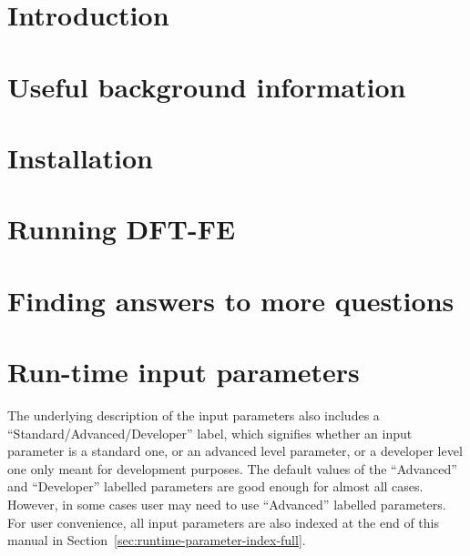 \documentclass{article}
\newcommand{\dftfe}{\textsc{DFT-FE}}
\begin{document}

\pagebreak

\tableofcontents

\pagebreak

\section{Introduction}
\label{sec:intro}


\section{Useful background information}
\label{sec:background}


\section{Installation}
\label{sec:installation}


\section{Running \dftfe}
\label{sec:run}


%

\section{Finding answers to more questions}
\label{sec:questions-and-answers}


\appendix

\section{Run-time input parameters}
\label{sec:parameters}
The underlying description of the input parameters also includes a ``Standard/Advanced/Developer'' label, which signifies whether an input parameter is
a standard one, or an advanced level parameter, or a developer level one only meant for development purposes. The default values of the ``Advanced'' and ``Developer'' labelled parameters are good enough for almost all cases. However, in some cases user may need to use ``Advanced'' labelled parameters. For user convenience,
all input parameters are also indexed at the end of this manual in Section~\ref{sec:runtime-parameter-index-full}.

\end{document}
